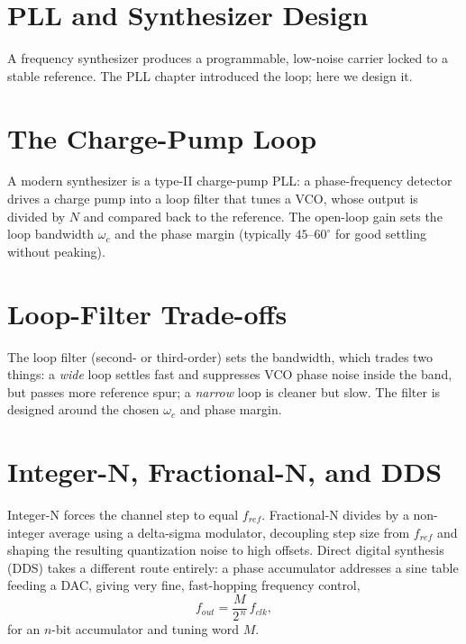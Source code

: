 \section{PLL and Synthesizer Design}\label{sec:tb_synth}



A frequency synthesizer produces a programmable, low-noise carrier locked to a
stable reference. The PLL chapter introduced the loop; here we design it.

\section{The Charge-Pump Loop}
A modern synthesizer is a type-II charge-pump PLL: a phase-frequency detector
drives a charge pump into a loop filter that tunes a VCO, whose output is divided
by $N$ and compared back to the reference. The open-loop gain sets the loop
bandwidth $\omega_c$ and the phase margin (typically $45$--$60^\circ$ for good
settling without peaking).

\section{Loop-Filter Trade-offs}
The loop filter (second- or third-order) sets the bandwidth, which trades two
things: a \emph{wide} loop settles fast and suppresses VCO phase noise inside the
band, but passes more reference spur; a \emph{narrow} loop is cleaner but slow.
The filter is designed around the chosen $\omega_c$ and phase margin.

\section{Integer-N, Fractional-N, and DDS}
Integer-N forces the channel step to equal $f_{ref}$. Fractional-N divides by a
non-integer average using a delta-sigma modulator, decoupling step size from
$f_{ref}$ and shaping the resulting quantization noise to high offsets. Direct
digital synthesis (DDS) takes a different route entirely: a phase accumulator
addresses a sine table feeding a DAC, giving very fine, fast-hopping frequency
control,
\[ f_{out} = \frac{M}{2^{\,n}}\,f_{clk}, \]
for an $n$-bit accumulator and tuning word $M$.



